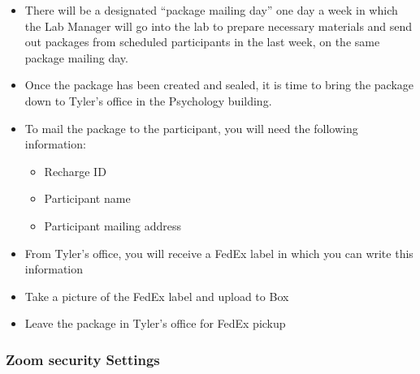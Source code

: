 \documentclass[]{book}
\providecommand{\tightlist}{%
  \setlength{\itemsep}{0pt}\setlength{\parskip}{0pt}}
\begin{document}
\begin{itemize}
\tightlist
\item
  There will be a designated ``package mailing day'' one day a week in which the Lab Manager will go into the lab to prepare necessary materials and send out packages from scheduled participants in the last week, on the same package mailing day.
\item
  Once the package has been created and sealed, it is time to bring the package down to Tyler's office in the Psychology building.
\item
  To mail the package to the participant, you will need the following information:

  \begin{itemize}
  \tightlist
  \item
    Recharge ID
  \item
    Participant name
  \item
    Participant mailing address
  \end{itemize}
\item
  From Tyler's office, you will receive a FedEx label in which you can write this information
\item
  Take a picture of the FedEx label and upload to Box
\item
  Leave the package in Tyler's office for FedEx pickup
\end{itemize}

\hypertarget{zoom-security-settings}{%
\subsubsection{Zoom security Settings}\label{zoom-security-settings}}
\end{document}
